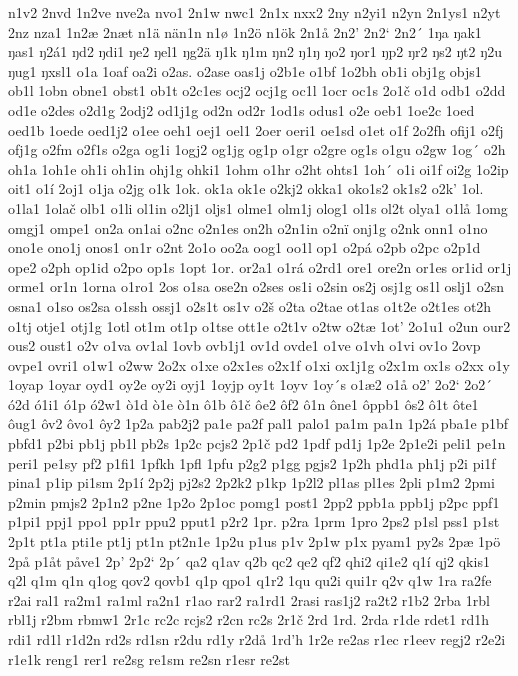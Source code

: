 n1v2
2nvd
1n2ve
nve2a
nvo1
2n1w
nwc1
2n1x
nxx2
2ny
n2yi1
n2yn
2n1ys1
n2yt
2nz
nza1
1n2æ
2næt
n1ä
nän1n
n1ø
1n2ö
n1ök
2n1å
2n2'
2n2`
2n2´
1ŋa
ŋak1
ŋas1
ŋ2á1
ŋd2
ŋdi1
ŋe2
ŋel1
ŋg2ä
ŋ1k
ŋ1m
ŋn2
ŋ1ŋ
ŋo2
ŋor1
ŋp2
ŋr2
ŋs2
ŋt2
ŋ2u
ŋug1
ŋxsl1
o1a
1oaf
oa2i
o2as.
o2ase
oas1j
o2b1e
o1bf
1o2bh
ob1i
obj1g
objs1
ob1l
1obn
obne1
obst1
ob1t
o2c1es
ocj2
ocj1g
oc1l
1ocr
oc1s
2o1č
o1d
odb1
o2dd
od1e
o2des
o2d1g
2odj2
od1j1g
od2n
od2r
1od1s
odus1
o2e
oeb1
1oe2c
1oed
oed1b
1oede
oed1j2
o1ee
oeh1
oej1
oel1
2oer
oeri1
oe1sd
o1et
o1f
2o2fh
ofij1
o2fj
ofj1g
o2fm
o2f1s
o2ga
og1i
1ogj2
og1jg
og1p
o1gr
o2gre
og1s
o1gu
o2gw
1og´
o2h
oh1a
1oh1e
oh1i
oh1in
ohj1g
ohki1
1ohm
o1hr
o2ht
ohts1
1oh´
o1i
oi1f
oi2g
1o2ip
oit1
o1í
2oj1
o1ja
o2jg
o1k
1ok.
ok1a
ok1e
o2kj2
okka1
oko1s2
ok1s2
o2k'
1ol.
o1la1
1olač
olb1
o1li
ol1in
o2lj1
oljs1
olme1
olm1j
olog1
ol1s
ol2t
olya1
o1lå
1omg
omgj1
ompe1
on2a
on1ai
o2nc
o2n1es
on2h
o2n1in
o2nï
onj1g
o2nk
onn1
o1no
ono1e
ono1j
onos1
on1r
o2nt
2o1o
oo2a
oog1
oo1l
op1
o2pá
o2pb
o2pc
o2p1d
ope2
o2ph
op1id
o2po
op1s
1opt
1or.
or2a1
o1rá
o2rd1
ore1
ore2n
or1es
or1id
or1j
orme1
or1n
1orna
o1ro1
2os
o1sa
ose2n
o2ses
os1i
o2sin
os2j
osj1g
os1l
oslj1
o2sn
osna1
o1so
os2sa
o1ssh
ossj1
o2s1t
os1v
o2š
o2ta
o2tae
ot1as
o1t2e
o2t1es
ot2h
o1tj
otje1
otj1g
1otl
ot1m
ot1p
o1tse
ott1e
o2t1v
o2tw
o2tæ
1ot'
2o1u1
o2un
our2
ous2
oust1
o2v
o1va
ov1al
1ovb
ovb1j1
ov1d
ovde1
o1ve
o1vh
o1vi
ov1o
2ovp
ovpe1
ovri1
o1w1
o2ww
2o2x
o1xe
o2x1es
o2x1f
o1xi
ox1j1g
o2x1m
ox1s
o2xx
o1y
1oyap
1oyar
oyd1
oy2e
oy2i
oyj1
1oyjp
oy1t
1oyv
1oy´s
o1æ2
o1å
o2'
2o2`
2o2´
ó2d
ó1i1
ó1p
ó2w1
ò1d
ò1e
ò1n
ô1b
ô1č
ôe2
ôf2
ô1n
ône1
ôppb1
ôs2
ô1t
ôte1
ôug1
ôv2
ôvo1
ôy2
1p2a
pab2j2
pa1e
pa2f
pal1
palo1
pa1m
pa1n
1p2á
pba1e
p1bf
pbfd1
p2bi
pb1j
pb1l
pb2s
1p2c
pcjs2
2p1č
pd2
1pdf
pd1j
1p2e
2p1e2i
peli1
pe1n
peri1
pe1sy
pf2
p1fi1
1pfkh
1pfl
1pfu
p2g2
p1gg
pgjs2
1p2h
phd1a
ph1j
p2i
pi1f
pina1
p1ip
pi1sm
2p1í
2p2j
pj2s2
2p2k2
p1kp
1p2l2
pl1as
pl1es
2pli
p1m2
2pmi
p2min
pmjs2
2p1n2
p2ne
1p2o
2p1oc
pomg1
post1
2pp2
ppb1a
ppb1j
p2pc
ppf1
p1pi1
ppj1
ppo1
pp1r
ppu2
pput1
p2r2
1pr.
p2ra
1prm
1pro
2ps2
p1sl
pss1
p1st
2p1t
pt1a
pti1e
pt1j
pt1n
pt2n1e
1p2u
p1us
p1v
2p1w
p1x
pyam1
py2s
2pæ
1pö
2på
p1åt
påve1
2p'
2p2`
2p´
qa2
q1av
q2b
qc2
qe2
qf2
qhi2
qi1e2
q1í
qj2
qkis1
q2l
q1m
q1n
q1og
qov2
qovb1
q1p
qpo1
q1r2
1qu
qu2i
qui1r
q2v
q1w
1ra
ra2fe
r2ai
ral1
ra2m1
ra1ml
ra2n1
r1ao
rar2
ra1rd1
2rasi
ras1j2
ra2t2
r1b2
2rba
1rbl
rbl1j
r2bm
rbmw1
2r1c
rc2c
rcjs2
r2cn
rc2s
2r1č
2rd
1rd.
2rda
r1de
rdet1
rd1h
rdi1
rd1l
r1d2n
rd2s
rd1sn
r2du
rd1y
r2då
1rd'h
1r2e
re2as
r1ec
r1eev
regj2
r2e2i
r1e1k
reng1
rer1
re2sg
re1sm
re2sn
r1esr
re2st
